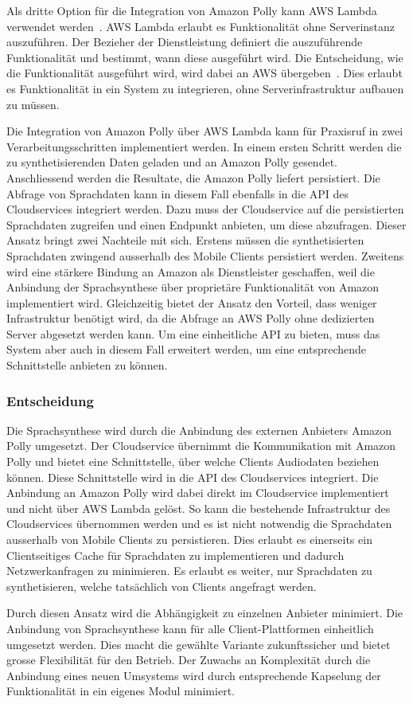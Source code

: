 Als dritte Option für die Integration von Amazon Polly kann AWS Lambda verwendet werden~\cite{aws_polly}.
AWS Lambda erlaubt es Funktionalität ohne Serverinstanz auszuführen.
Der Bezieher der Dienstleistung definiert die auszuführende Funktionalität und bestimmt, wann diese ausgeführt wird.
Die Entscheidung, wie die Funktionalität ausgeführt wird, wird dabei an AWS übergeben~\cite{aws_lambda}.
Dies erlaubt es Funktionalität in ein System zu integrieren, ohne Serverinfrastruktur aufbauen zu müssen.

Die Integration von Amazon Polly über AWS Lambda kann für Praxisruf in zwei Verarbeitungsschritten implementiert werden.
In einem ersten Schritt werden die zu synthetisierenden Daten geladen und an Amazon Polly gesendet.
Anschliessend werden die Resultate, die Amazon Polly liefert persistiert.
Die Abfrage von Sprachdaten kann in diesem Fall ebenfalls in die API des Cloudservices integriert werden.
Dazu muss der Cloudservice auf die persistierten Sprachdaten zugreifen und einen Endpunkt anbieten, um diese abzufragen.
Dieser Ansatz bringt zwei Nachteile mit sich.
Erstens müssen die synthetisierten Sprachdaten zwingend ausserhalb des Mobile Clients persistiert werden.
Zweitens wird eine stärkere Bindung an Amazon als Dienstleister geschaffen, weil die Anbindung der Sprachsynthese über proprietäre Funktionalität von Amazon implementiert wird.
Gleichzeitig bietet der Ansatz den Vorteil, dass weniger Infrastruktur benötigt wird, da die Abfrage an AWS Polly ohne dedizierten Server abgesetzt werden kann.
Um eine einheitliche API zu bieten, muss das System aber auch in diesem Fall erweitert werden, um eine entsprechende Schnittstelle anbieten zu können.

\subsubsection{Entscheidung}

Die Sprachsynthese wird durch die Anbindung des externen Anbieters Amazon Polly umgesetzt.
Der Cloudservice übernimmt die Kommunikation mit Amazon Polly und bietet eine Schnittstelle, über welche Clients Audiodaten beziehen können.
Diese Schnittstelle wird in die API des Cloudservices integriert.
Die Anbindung an Amazon Polly wird dabei direkt im Cloudservice implementiert und nicht über AWS Lambda gelöst.
So kann die bestehende Infrastruktur des Cloudservices übernommen werden und es ist nicht notwendig die Sprachdaten ausserhalb von Mobile Clients zu persistieren.
Dies erlaubt es einerseits ein Clientseitiges Cache für Sprachdaten zu implementieren und dadurch Netzwerkanfragen zu minimieren.
Es erlaubt es weiter, nur Sprachdaten zu synthetisieren, welche tatsächlich von Clients angefragt werden.

Durch diesen Ansatz wird die Abhängigkeit zu einzelnen Anbieter minimiert.
Die Anbindung von Sprachsynthese kann für alle Client-Plattformen einheitlich umgesetzt werden.
Dies macht die gewählte Variante zukunftssicher und bietet grosse Flexibilität für den Betrieb.
Der Zuwachs an Komplexität durch die Anbindung eines neuen Umsystems wird durch entsprechende Kapselung der Funktionalität in ein eigenes Modul minimiert.

\clearpage
